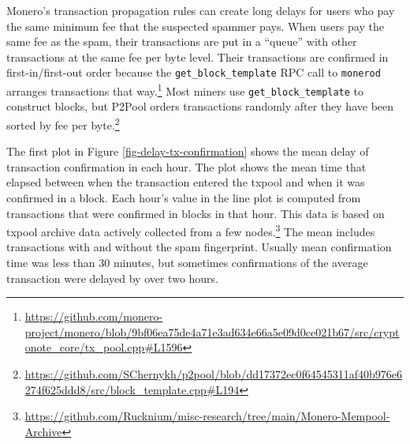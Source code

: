 \documentclass[usletter,11pt,english,openany]{article}
\begin{document}
Monero's transaction propagation rules can create long delays for
users who pay the same minimum fee that the suspected spammer pays.
When users pay the same fee as the spam, their transactions are put
in a ``queue'' with other transactions at the same fee per byte
level. Their transactions are confirmed in first-in/first-out order
because the \texttt{get\_block\_template} RPC call to \texttt{monerod}
arranges transactions that way.\footnote{\url{https://github.com/monero-project/monero/blob/9bf06ea75de4a71e3ad634e66a5e09d0ce021b67/src/cryptonote_core/tx_pool.cpp\#L1596}}
Most miners use \texttt{get\_block\_template} to construct blocks,
but P2Pool orders transactions randomly after they have been sorted
by fee per byte.\footnote{\url{https://github.com/SChernykh/p2pool/blob/dd17372ec0f64545311af40b976e6274f625ddd8/src/block_template.cpp\#L194}}

The first plot in Figure \ref{fig-delay-tx-confirmation} shows the
mean delay of transaction confirmation in each hour. The plot shows
the mean time that elapsed between when the transaction entered the
txpool and when it was confirmed in a block. Each hour's value in
the line plot is computed from transactions that were confirmed in
blocks in that hour. This data is based on txpool archive data actively
collected from a few nodes.\footnote{\url{https://github.com/Rucknium/misc-research/tree/main/Monero-Mempool-Archive}}
The mean includes transactions with and without the spam fingerprint.
Usually mean confirmation time was less than 30 minutes, but sometimes
confirmations of the average transaction were delayed by over two
hours.
\end{document}
